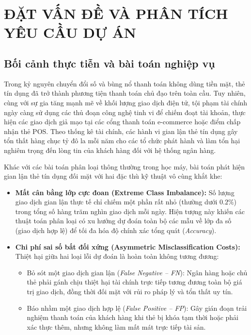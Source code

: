 \documentclass[13pt,a4paper]{extarticle}
\begin{document}
\section{ĐẶT VẤN ĐỀ VÀ PHÂN TÍCH YÊU CẦU DỰ ÁN}

\subsection{Bối cảnh thực tiễn và bài toán nghiệp vụ}
Trong kỷ nguyên chuyển đổi số và bùng nổ thanh toán không dùng tiền mặt, thẻ tín dụng đã trở thành phương tiện thanh toán chủ đạo trên toàn cầu. Tuy nhiên, cùng với sự gia tăng mạnh mẽ về khối lượng giao dịch điện tử, tội phạm tài chính ngày càng sử dụng các thủ đoạn công nghệ tinh vi để chiếm đoạt tài khoản, thực hiện các giao dịch giả mạo tại các cổng thanh toán e-commerce hoặc điểm chấp nhận thẻ POS. Theo thống kê tài chính, các hành vi gian lận thẻ tín dụng gây tổn thất hàng chục tỷ đô la mỗi năm cho các tổ chức phát hành và làm tổn hại nghiêm trọng đến lòng tin của khách hàng đối với hệ thống ngân hàng.

Khác với các bài toán phân loại thông thường trong học máy, bài toán phát hiện gian lận thẻ tín dụng đối mặt với hai đặc thù kỹ thuật vô cùng khắt khe:
\begin{itemize}
    \item \textbf{Mất cân bằng lớp cực đoan (Extreme Class Imbalance):} Số lượng giao dịch gian lận thực tế chỉ chiếm một phần rất nhỏ (thường dưới $0.2\%$) trong tổng số hàng trăm nghìn giao dịch mỗi ngày. Hiện tượng này khiến các thuật toán phân loại có xu hướng dự đoán toàn bộ các mẫu về lớp đa số (giao dịch hợp lệ) để tối đa hóa độ chính xác tổng quát (\textit{Accuracy}).
    \item \textbf{Chi phí sai số bất đối xứng (Asymmetric Misclassification Costs):} Thiệt hại giữa hai loại lỗi dự đoán là hoàn toàn không tương đương:
    \begin{itemize}
        \item Bỏ sót một giao dịch gian lận (\textit{False Negative -- FN}): Ngân hàng hoặc chủ thẻ phải gánh chịu thiệt hại tài chính trực tiếp tương đương toàn bộ giá trị giao dịch, đồng thời đối mặt với rủi ro pháp lý và tổn thất uy tín.
        \item Báo nhầm một giao dịch hợp lệ (\textit{False Positive -- FP}): Gây gián đoạn trải nghiệm thanh toán của khách hàng khi thẻ bị khóa tạm thời hoặc phải xác thực thêm, nhưng không làm mất mát trực tiếp tài sản.
    \end{itemize}
\end{itemize}
\end{document}
